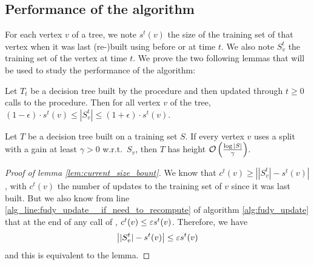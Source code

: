\subsection{Performance of the \algo{} algorithm}
For each vertex $v$ of a tree, we note $s^t(v)$ the size of the training set of that vertex when it was last (re-)built using \AlgoBuild{} before or at time $t$. We also note $S^t_v$ the training set of the vertex at time $t$. We prove the two following lemmas that will be used to study the performance of the algorithm:
\begin{lemma}\label{lem:current_size_bount}
Let $T_t$ be a decision tree built by the \AlgoBuild{} procedure and then updated through $t \geq 0$ calls to the \AlgoUpdate{} procedure. Then for all vertex $v$ of the tree, $(1-\epsilon) \cdot s^t(v) \leq |S^t_v| \leq (1+\epsilon) \cdot  s^t(v)$.
\end{lemma}
\begin{lemma}\label{lem:height_bound}
Let $T$ be a decision tree built on a training set $S$. If every vertex $v$ uses a split with a gain at least $\gamma > 0$ w.r.t.\ $S_v$, then $T$ has height  $\mathcal{O} \left(\frac{\log |S|}{\gamma}  \right)  $.
\end{lemma}
\begin{proof}[Proof of lemma \ref{lem:current_size_bount}]
    We know that $c^t(v) \geq \left||S^t_v| - s^t(v)\right|$, with $c^t(v)$ the number of updates to the training set of $v$ since it was last built. But we also know from line \ref{alg_line:fudy_update__if_need_to_recompute} of algorithm \ref{alg:fudy_update} that at the end of any call of \AlgoUpdate{}, $c^t(v) \leq \varepsilon s^t(v)$. Therefore, we have
    \begin{equation*}
        \left||S^t_v| - s^t(v)\right| \leq \varepsilon s^t(v) 
    \end{equation*}
    and this is equivalent to the lemma.
\end{proof}

